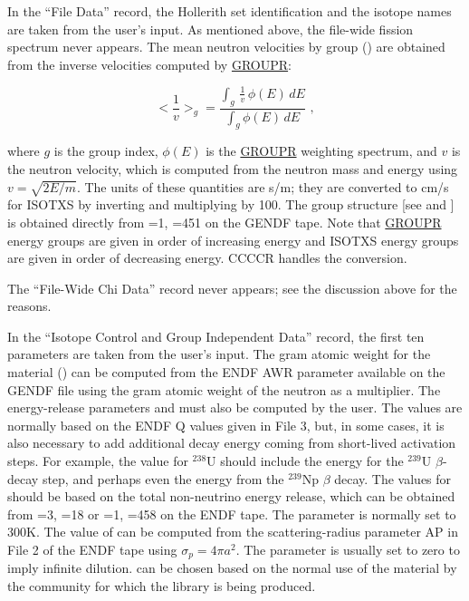 In the ``File Data'' record, the Hollerith set identification and the
isotope names are taken from the user's input.  As mentioned above,
the file-wide fission spectrum  never appears.  The mean
neutron velocities by group () are obtained from the inverse
velocities computed by \hyperlink{sGROUPRhy}{GROUPR}:

\begin{equation}
  \Big<\frac{1}{v}\Big>_g=\frac{\displaystyle\int_g \,\frac{1}{v}\,\phi(E)\,dE}
        {\displaystyle\int_g \phi(E)\,dE} \,\,,
\end{equation}
\vspace{1 pt}

\noindent
where $g$ is the group index, $\phi(E)$ is the
\hyperlink{sGROUPRhy}{GROUPR} weighting spectrum,
and $v$ is the neutron velocity, which is computed from the neutron mass
and energy using $v{=}\sqrt{2E/m}$.  The units of these quantities are s/m;
they are converted to cm/s for ISOTXS by inverting and multiplying by 100.
The group structure [see  and ] is obtained
directly from =1, =451 on the GENDF tape.  Note
that \hyperlink{sGROUPRhy}{GROUPR} energy groups
are given in order of increasing energy and ISOTXS energy groups are given
in order of decreasing energy.  CCCCR handles the conversion.

The ``File-Wide Chi Data'' record never appears; see the discussion
above for the reasons.

In the ``Isotope Control and Group Independent Data'' record, the first
ten parameters are  taken from the user's input.  The gram atomic weight
for the material () can be computed from the ENDF AWR
parameter available on the GENDF file using the gram atomic weight of
the neutron as a multiplier.  The energy-release parameters 
and  must also be computed by the user.  The 
values are normally based on the ENDF Q values given in File 3, but,
in some cases, it is also necessary to add additional decay energy
coming from short-lived activation steps.  For example, the 
value for $^{238}$U should include the energy for the $^{239}$U
$\beta$-decay step, and perhaps even the energy from the $^{239}$Np
$\beta$ decay.  The values for  should be based on the total
non-neutrino energy release, which can be obtained from
=3, =18 or
=1, =458 on the ENDF tape.  The 
parameter is normally set
to 300K.  The value of  can be computed from the
scattering-radius parameter AP in File 2 of the ENDF tape using
$\sigma_p{=}4\pi a^2$.  The parameter  is usually set
to zero to imply infinite dilution.   can be chosen based
on the normal use of the material by the community for which the library
is being produced.

